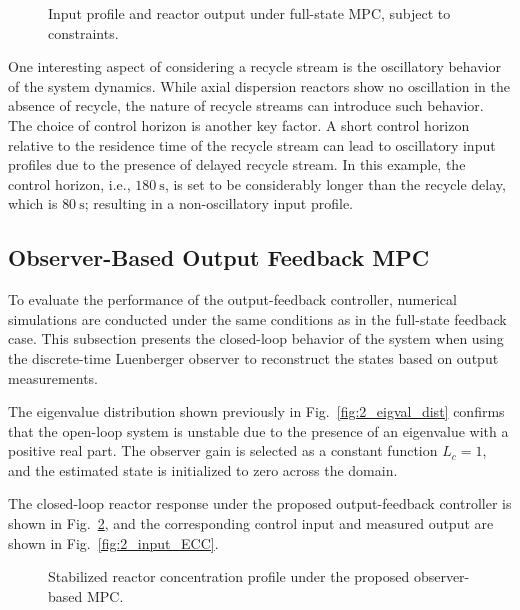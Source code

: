 \begin{figure}[!htbp]
    \centering
    
    \caption{Input profile and reactor output under full-state MPC, subject to constraints.}
    \label{fig:2_input}
\end{figure}

One interesting aspect of considering a recycle stream is the oscillatory behavior of the system dynamics. While axial dispersion reactors show no oscillation in the absence of recycle, the nature of recycle streams can introduce such behavior. The choice of control horizon is another key factor. A short control horizon relative to the residence time of the recycle stream can lead to oscillatory input profiles due to the presence of delayed recycle stream. In this example, the control horizon, i.e., $180~\mathrm{s}$, is set to be considerably longer than the recycle delay, which is $80~\mathrm{s}$; resulting in a non-oscillatory input profile.

\subsection{Observer-Based Output Feedback MPC}

To evaluate the performance of the output-feedback controller, numerical simulations are conducted under the same conditions as in the full-state feedback case. This subsection presents the closed-loop behavior of the system when using the discrete-time Luenberger observer to reconstruct the states based on output measurements.

The eigenvalue distribution shown previously in Fig.~\ref{fig:2_eigval_dist} confirms that the open-loop system is unstable due to the presence of an eigenvalue with a positive real part. The observer gain is selected as a constant function $L_c = 1$, and the estimated state is initialized to zero across the domain. %

The closed-loop reactor response under the proposed output-feedback controller is shown in Fig.~\ref{fig:2_closed_ECC}, and the corresponding control input and measured output are shown in Fig.~\ref{fig:2_input_ECC}. 

\begin{figure}[!htbp]
    \centering
    
    \caption{Stabilized reactor concentration profile under the proposed observer-based MPC.}
    \label{fig:2_closed_ECC}
\end{figure}

